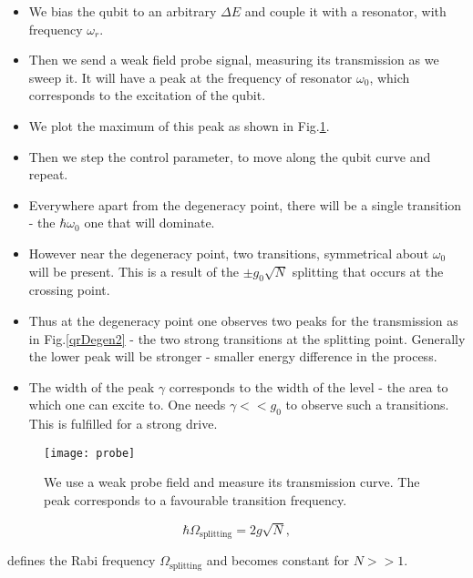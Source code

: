 \begin{itemize}
\item We bias the qubit to an arbitrary  $ \Delta E $ and couple it with a
  resonator, with frequency $ \omega_r $.
\item  Then  we  send  a  weak  field  probe  signal,  measuring  its
  transmission as we sweep it.  It  will have a peak at the frequency
  of resonator $  \omega_0 $, which corresponds to  the excitation of
  the qubit.
\item We plot the maximum of this peak as shown in Fig.\ref{qrProbe}.
\item Then  we step the  control parameter,  to move along  the qubit
  curve and repeat.
\item Everywhere  apart from  the degeneracy point,  there will  be a
  single transition - the $ \hbar\omega_0 $ one that will dominate.
\item However near the degeneracy point, two transitions, symmetrical
  about  $ \omega_0  $ will  be  present.  This  is a  result of  the
  $ \pm g_0\sqrt{N} $ splitting that occurs at the crossing point.
\item Thus  at the degeneracy  point one  observes two peaks  for the
  transmission as in Fig.\ref{qrDegen2}  - the two strong transitions
  at the splitting point.  Generally  the lower peak will be stronger
  - smaller energy difference in the process.
\item The width  of the peak $  \gamma $ corresponds to  the width of
  the  level -  the  area to  which  one can  excite  to.  One  needs
  $ \gamma<<g_0 $  to observe such a transitions.   This is fulfilled
  for a strong drive.
\end{itemize}

\begin{figure}
  \centering \texttt{[image: probe]}
  \caption{We use  a weak  probe field  and measure  its transmission
    curve.   The   peak  corresponds   to  a   favourable  transition
    frequency. \label{qrProbe}}
\end{figure}

\begin{framed}\noindent
  \begin{equation} \hbar\Omega_\text{splitting} = 2g\sqrt{N},
  \end{equation}

  \noindent defines  the Rabi  frequency $  \Omega_\text{splitting} $
  and becomes constant for $N>>1$.
\end{framed}


